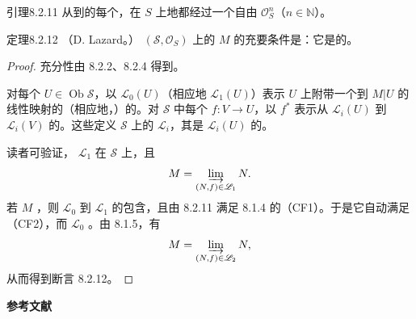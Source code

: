 \begin{SGAresult}{引理}{8.2.11}
从到的每个，在 $S$ 上地都经过一个自由 $\mathcal O_S^n$（$n\in\mathbb N$）。
\end{SGAresult}
\begin{SGAresult}{定理}{8.2.12}
（D. Lazard。）
 $(\mathscr S,\mathcal O_S)$ 上的 $M$ 的充要条件是：它是的。
\end{SGAresult}
\begin{proof}
充分性由 8.2.2、8.2.4 得到。

对每个 $U\in\operatorname{Ob}\mathscr S$，以 $\mathscr L_0(U)$（相应地 $\mathscr L_1(U)$）表示 $U$ 上附带一个到 $M|U$ 的线性映射的（相应地，）的。对 $\mathscr S$ 中每个 $f:V\to U$，以 $f^*$ 表示从 $\mathscr L_i(U)$ 到 $\mathscr L_i(V)$ 的。这些定义 $\mathscr S$ 上的 $\mathscr L_i$，其是 $\mathscr L_i(U)$ 的。

读者可验证， $\mathscr L_1$ 在 $\mathscr S$ 上，且
\[M=\varinjlim_{(N,f)\in\mathscr L_1}N.\]
若 $M$ ，则 $\mathscr L_0$ 到 $\mathscr L_1$ 的包含，且由 8.2.11 满足 8.1.4 的（CF1）。于是它自动满足（CF2），而 $\mathscr L_0$ 。由 8.1.5，有
\[M=\varinjlim_{(N,f)\in\mathscr L_2}N,\]
从而得到断言 8.2.12。
\end{proof}
\textbf{参考文献}
